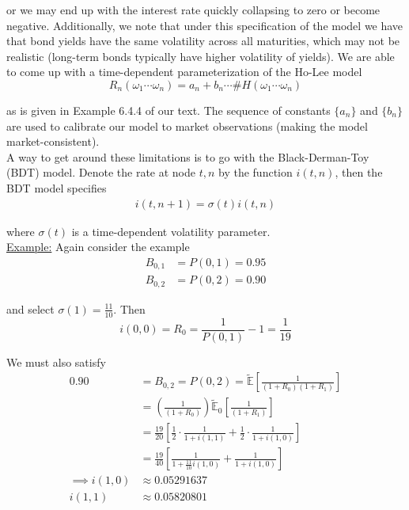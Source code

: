 \documentclass[12pt]{article}
\newcommand{\E}{\mathbb E}
\begin{document}
or we may end up with the interest rate quickly collapsing to zero or become negative. Additionally, we note that under this specification of the model we have that bond yields have the same volatility across all maturities, which may not be realistic (long-term bonds typically have higher volatility of yields). We are able to come up with a time-dependent parameterization of the Ho-Lee model
\begin{equation*}
	R_n(\omega_1\cdots\omega_n) = a_n + b_n \cdots \# H(\omega_1\cdots\omega_n)
\end{equation*}

as is given in Example 6.4.4 of our text. The sequence of constants $\{a_n\}$ and $\{b_n\}$ are used to calibrate our model to market observations (making the model market-consistent). \\

A way to get around these limitations is to go with the Black-Derman-Toy (BDT) model. Denote the rate at node $t,n$ by the function $i(t,n)$, then the BDT model specifies
\begin{align*}
	i(t, n + 1) = \sigma(t)i(t,n)
\end{align*}

where $\sigma(t)$ is a time-dependent volatility parameter. \\

\underline{Example:} Again consider the example
\begin{align*}
	B_{0,1} &= P(0,1) = 0.95 \\
	B_{0,2} &= P(0,2) = 0.90
\end{align*}

and select $\sigma(1) = \frac{11}{10}$. Then
\begin{equation*}
	i(0,0) = R_0 = \frac{1}{P(0,1)} - 1 = \frac{1}{19}
\end{equation*}

We must also satisfy
\begin{align*}
	0.90 &= B_{0,2} = P(0,2) = \tilde{\E} \left[ \frac{1}{(1 + R_0)(1 + R_1)} \right] \\
	&= \left( \frac{1}{(1 + R_0)} \right) \tilde{\E}_0 \left[ \frac{1}{(1 + R_1)} \right] \\
	&= \frac{19}{20} \left[ \frac{1}{2}\cdot \frac{1}{1 + i(1,1)} + \frac{1}{2}\cdot \frac{1}{1 + i(1,0)} \right] \\
	&= \frac{19}{40} \left[ \frac{1}{1 + \frac{11}{10}i(1,0)} + \frac{1}{1 + i(1,0)} \right] \\
	\implies i(1,0) &\approx 0.05291637 \\
	i(1,1) &\approx 0.05820801
\end{align*}
\end{document}
